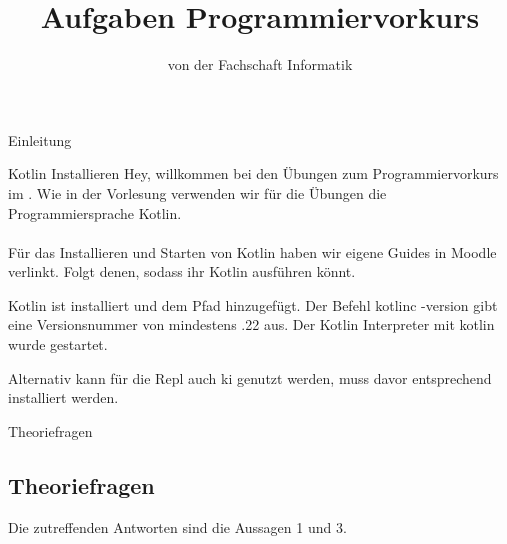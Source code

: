 
\title{Aufgaben Programmiervorkurs}
\subtitle{von der Fachschaft Informatik\hfill\ptitle}

\usepackage{hyperref}
\usepackage{wrapfig}


\maketitle{}

\begin{task}[points=auto]{Einleitung}
    \begin{subtask*}[points=0]{Kotlin Installieren}
        Hey, willkommen bei den Übungen zum Programmiervorkurs im \ptitle. Wie in der
        Vorlesung verwenden wir für die Übungen die Programmiersprache Kotlin. \\\\
        Für das Installieren und Starten von Kotlin haben wir eigene Guides in Moodle verlinkt.
        Folgt denen, sodass ihr Kotlin ausführen könnt.
        \begin{solution}
            Kotlin ist installiert und dem Pfad hinzugefügt. Der Befehl
            {\ttfamily kotlinc -version} gibt eine Versionsnummer von mindestens {.22} aus.
            Der Kotlin Interpreter mit {\ttfamily kotlin} wurde gestartet.

            Alternativ kann für die Repl auch {\ttfamily ki} genutzt werden,
            muss davor entsprechend installiert werden.
        \end{solution}
    \end{subtask*}
    \begin{subtask*}[points=0]{Theoriefragen}
        \subsection{Theoriefragen}
        \begin{itemize}
            \mchead
        \end{itemize}
        \begin{solution}
            Die zutreffenden Antworten sind die Aussagen 1 und 3.
        \end{solution}
    \end{subtask*}
\end{task}
